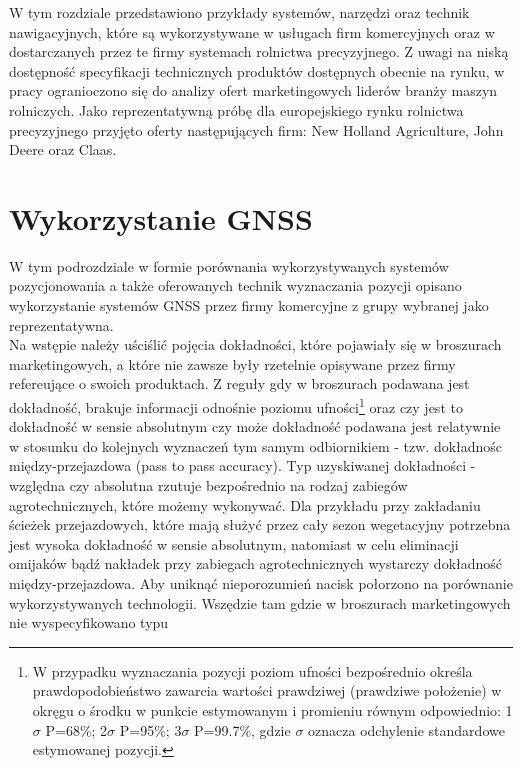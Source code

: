 W tym rozdziale przedstawiono przykłady systemów, narzędzi oraz technik nawigacyjnych, które są wykorzystywane w usługach firm komercyjnych 
oraz w dostarczanych przez te firmy systemach rolnictwa precyzyjnego. Z uwagi na niską dostępność specyfikacji technicznych produktów 
dostępnych obecnie na rynku, w pracy ogranioczono się do analizy ofert marketingowych liderów branży maszyn rolniczych.
Jako reprezentatywną próbę dla europejskiego rynku rolnictwa precyzyjnego przyjęto oferty następujących firm: New Holland Agriculture,
John Deere oraz Claas.
\section{Wykorzystanie GNSS}
W tym podrozdziale w formie porównania wykorzystywanych systemów pozycjonowania a także oferowanych technik wyznaczania pozycji opisano wykorzystanie 
systemów GNSS przez firmy komercyjne z grupy wybranej jako reprezentatywna.\\
\indent Na wstępie należy uściślić pojęcia dokładności, które pojawiały się w broszurach marketingowych, a które nie zawsze były rzetelnie opisywane 
przez firmy refereujące o swoich produktach. Z reguły gdy w broszurach podawana jest dokładność, brakuje informacji odnośnie poziomu ufności\footnote{
W przypadku wyznaczania pozycji poziom ufności bezpośrednio określa prawdopodobieństwo zawarcia wartości prawdziwej (prawdziwe położenie) w okręgu o środku w punkcie 
estymowanym i promieniu równym odpowiednio: 1$\sigma$ P=68\%; 2$\sigma$ P=95\%; 3$\sigma$ P=99.7\%, gdzie $\sigma$ oznacza odchylenie standardowe estymowanej pozycji.}
oraz czy jest to dokładność w sensie absolutnym czy może dokładność podawana jest relatywnie w stosunku do kolejnych wyznaczeń tym samym odbiornikiem - tzw.
dokładnośc między-przejazdowa (pass to pass accuracy). Typ uzyskiwanej dokładności - względna czy absolutna rzutuje bezpośrednio na rodzaj zabiegów 
agrotechnicznych, które możemy wykonywać. Dla przykładu przy zakładaniu ścieżek przejazdowych, które mają służyć przez cały sezon wegetacyjny potrzebna 
jest wysoka dokładność w sensie absolutnym, natomiast w celu eliminacji omijaków bądź nakładek przy zabiegach agrotechnicznych wystarczy dokładność między-przejazdowa.
Aby uniknąć nieporozumień nacisk połorzono na porównanie wykorzystywanych technologii. Wszędzie tam gdzie w broszurach marketingowych nie wyspecyfikowano typu 
